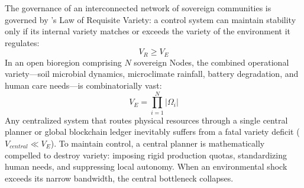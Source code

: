 The governance of an interconnected network of sovereign communities is governed by \textcite{ashby1956}'s Law of Requisite Variety: a control system can maintain stability only if its internal variety matches or exceeds the variety of the environment it regulates:
\begin{equation}
    V_R \ge V_E
    \label{eq:ashby_law}
\end{equation}
In an open bioregion comprising $N$ sovereign Nodes, the combined operational variety—soil microbial dynamics, microclimate rainfall, battery degradation, and human care needs—is combinatorially vast:
\begin{equation}
    V_E = \prod_{i=1}^N |\Omega_i|
    \label{eq:bioregional_variety}
\end{equation}
Any centralized system that routes physical resources through a single central planner or global blockchain ledger inevitably suffers from a fatal variety deficit ($V_{central} \ll V_E$). To maintain control, a central planner is mathematically compelled to destroy variety: imposing rigid production quotas, standardizing human needs, and suppressing local autonomy. When an environmental shock exceeds its narrow bandwidth, the central bottleneck collapses.


